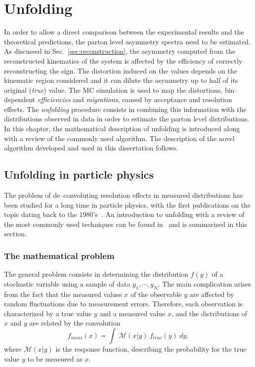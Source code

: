 \chapter{Unfolding}
\label{sec:unfolding}

In order to allow a direct comparison between the experimental results
and the theoretical predictions, the parton level asymmetry spectra need
to be estimated.
As discussed in Sec.~\ref{sec:reconstruction}, the asymmetry computed
from the reconstructed kinematics of the \ttbar{} system is affected
by the efficiency of correctly reconstructing the \dy{} sign. The
distortion induced on the \ac{} values depends on the kinematic region
considered and it can dilute the asymmetry up to half of its original
({\it true}) value.
The \ttbar{} MC simulation is used to map the distortions,
bin--dependent {\it efficiencies} and {\it migrations}, caused by
acceptance and resolution effects. The {\it unfolding} procedure
consists in combining this information with the distributions observed
in data in order to estimate the parton level distributions.
In this chapter, the mathematical description of unfolding
is introduced along with a review of the commonly used algorithm.
The description of the novel algorithm developed and used in this
dissertation follows.

\section{Unfolding in particle physics}

The problem of de--convoluting resolution effects in measured
distributions has been studied for a long time in particle physics,
with the first publications on the topic dating back to the
1980's~\cite{Blobel:157405}. An introduction to unfolding with a
review of the most commonly used techniques can be found
in~\cite{Cowan:2002in} and is summarized in this section. 

\subsection{The mathematical problem}

The general problem consists in determining the distribution $f(y)$ of a
stochastic variable using a sample of data $y_1,\cdots{},y_N$.
The main complication arises from the fact that the measured values
$x$ of the observable $y$ are affected by random fluctuations due to
measurement errors. Therefore, each observation is characterized by a
true value $y$ and a measured value $x$, and the distributions of $x$
and $y$ are related by the convolution
\begin{equation}
\label{eq:convolution}
f_{meas}(x) = \int~\mathcal{M}(x|y)~f_{true}(y)~dy,
\end{equation}
where $\mathcal{M}(x|y)$ is the response function, describing the
probability for the true value $y$ to be measured as $x$.

